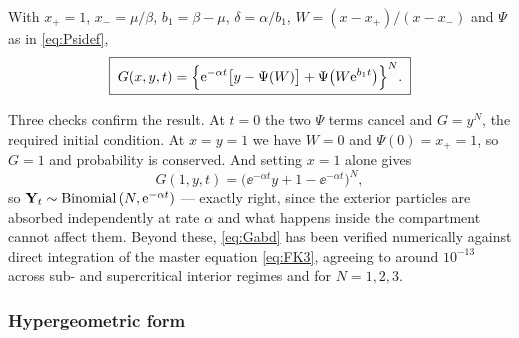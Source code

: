 \begin{proposition}
\label{prop:Gabd}
With $x_+=1$, $x_-=\mu/\beta$, $b_1=\beta-\mu$, $\delta=\alpha/b_1$,
$W = (x-x_+)/(x-x_-)$ and $\Psi$ as in \cref{eq:Psidef},
\begin{equation}
\label{eq:Gabd}
\boxed{\;
G(x,y,t) = \Bigl\{{\rm e}^{-\alpha t}\bigl[y-\Psi(W)\bigr] + \Psi\bigl(W{\rm e}^{b_1t}\bigr)\Bigr\}^{N}. \;}
\end{equation}
\end{proposition}

Three checks confirm the result. At $t=0$ the two $\Psi$ terms cancel and $G=y^N$, the
required initial condition. At $x=y=1$ we have $W=0$ and $\Psi(0)=x_+=1$, so $G=1$ and
probability is conserved. And setting $x=1$ alone gives
\begin{equation*}
G(1,y,t) = \bigl(\ee^{-\alpha t}y + 1 - \ee^{-\alpha t}\bigr)^{N},
\end{equation*}
so ${{\bf Y}_t}\sim\text{Binomial}\left( N,{\rm e}^{-\alpha t}\right)$ --- exactly right, since the exterior
particles are absorbed independently at rate $\alpha$ and what happens inside the
compartment cannot affect them. Beyond these, \cref{eq:Gabd} has been verified numerically
against direct integration of the master equation \cref{eq:FK3}, agreeing to around
$10^{-13}$ across sub- and supercritical interior regimes and for $N=1,2,3$.

\subsubsection*{Hypergeometric form}

